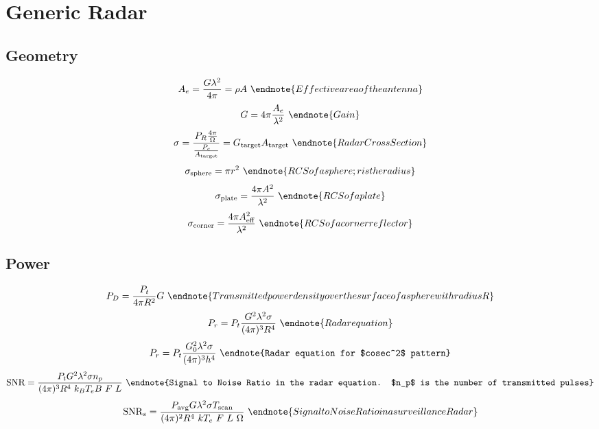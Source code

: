 \section{Generic Radar}
\subsection{Geometry}
\begin{multicols}{3} \noindent
	$$ A_e = \frac{G \lambda^2}{4 \pi} = \rho A \
		\endnote{Effective area of the antenna}
		$$
	$$ G = 4 \pi \frac{A_e}{\lambda^2} \
		\endnote{Gain}
		$$
	$$ 	\sigma =
			\frac{P_R \frac{4 \pi}{\Omega}}{\frac{P_c}{A_\text{target}}} =
			G_\text{target} A_\text{target} \
		\endnote{Radar Cross Section}
		$$
	$$ \sigma_\text{sphere} = \pi r^2 \
		\endnote{RCS of a sphere; r is the radius}
		$$
	$$ \sigma_\text{plate} = \frac{4 \pi A^2}{\lambda^2} \
		\endnote{RCS of a plate}
		$$
	$$ \sigma_\text{corner} = \frac{4 \pi A_\text{eff}^2}{\lambda^2} \
		\endnote{RCS of a corner reflector}
		$$
\end{multicols}

\subsection{Power}
\begin{multicols}{3} \noindent
	$$ P_D = \frac{P_t}{4 \pi R^2} G \
		\endnote{Transmitted power density over the surface of a sphere with radius R}
		$$
	$$ P_r = P_t \frac{G^2 \lambda^2 \sigma}{(4 \pi)^3 R^4} \
		\endnote{Radar equation}
		$$
	$$ P_r = P_t \frac{G_0^2 \lambda ^2 \sigma}{(4 \pi)^3 h^4} \
		\endnote{Radar equation for $cosec^2$ pattern}
		$$
	$$ \text{SNR} = \frac{P_t G^2 \lambda^2 \sigma n_p}{(4 \pi)^3 R^4 \ k_B T_e B \ F \ L} \
		\endnote{Signal to Noise Ratio in the radar equation. $n_p$ is the number of transmitted pulses}
		$$
	$$ \text{SNR}_s = \frac{P_\text{avg} G \lambda ^ 2 \sigma T_\text{scan}}
		{(4 \pi)^2 R^4 \ k T_e \ F \ L \ \Omega} \
		\endnote{Signal to Noise Ratio in a surveillance Radar}
		$$
\end{multicols}
\printendnotes[itemize]
